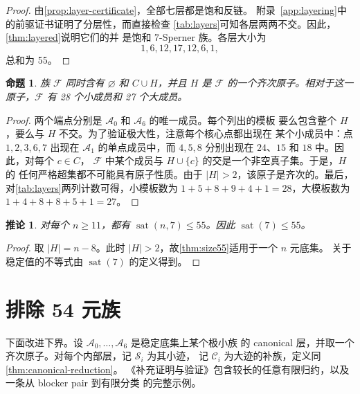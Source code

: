 \documentclass[UTF8,11pt,a4paper,fontset=fandol]{ctexart}
\newtheorem{proposition}[theorem]{命题}
\newtheorem{corollary}[theorem]{推论}
\theoremstyle{definition}
\theoremstyle{remark}
\newcommand{\family}{\mathcal{F}}
\newcommand{\sat}{\operatorname{sat}}
\begin{document}
\begin{proof}
由\cref{prop:layer-certificate}，全部七层都是饱和反链。
附录~\ref{app:layering}中的前驱证书证明了分层性，而直接检查
\cref{tab:layers}可知各层两两不交。因此，\cref{thm:layered}说明它们的并
是饱和 7-Sperner 族。各层大小为
\[
  1, 6, 12, 17, 12, 6, 1,
\]
总和为 55。
\end{proof}

\begin{proposition}
\label{prop:endpoints-atom}
族 $\family$ 同时含有 $\varnothing$ 和 $C\cup H$，并且 $H$ 是
$\family$ 的一个齐次原子。相对于这一原子，$\family$ 有 28 个小成员和
27 个大成员。
\end{proposition}

\begin{proof}
两个端点分别是 $\mathcal A_0$ 和 $\mathcal A_6$ 的唯一成员。每个列出的模板
要么包含整个 $H$，要么与 $H$ 不交。为了验证极大性，注意每个核心点都出现在
某个小成员中：点 $1,2,3,6,7$ 出现在 $\mathcal A_1$ 的单点成员中，而
$4,5,8$ 分别出现在 $24$、$15$ 和 $18$ 中。因此，对每个 $c\in C$，
$\family$ 中某个成员与 $H\cup\{c\}$ 的交是一个非空真子集。于是，$H$ 的
任何严格超集都不可能具有原子性质。由于 $|H|>2$，该原子是齐次的。最后，
对\cref{tab:layers}两列计数可得，小模板数为
$1+5+8+9+4+1=28$，大模板数为
$1+4+8+8+5+1=27$。
\end{proof}

\par\medskip

\begin{corollary}
\label{cor:main-bound}
对每个 $n\geq11$，都有 $\sat(n,7)\leq55$。因此 $\sat(7)\leq55$。
\end{corollary}

\begin{proof}
取 $|H|=n-8$。此时 $|H|>2$，故\cref{thm:size55}适用于一个 $n$ 元底集。
关于稳定值的不等式由 $\sat(7)$ 的定义得到。
\end{proof}

\section{排除 54 元族}
\label{sec:exact-seven}

下面改进下界。设 $\mathcal A_0,\ldots,\mathcal A_6$ 是稳定底集上某个极小族
的 canonical 层，并取一个齐次原子。对每个内部层，记 $\mathcal S_i$ 为其小迹，
记 $\mathcal C_i$ 为大迹的补族，定义同\cref{thm:canonical-reduction}。
《补充证明与验证》包含较长的任意有限归约，以及一条从 blocker pair 到有限分类
的完整示例。
\end{document}
